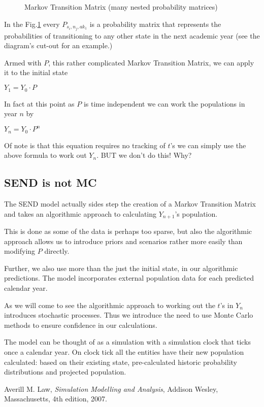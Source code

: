 \documentclass[margin=5mm]{article}
\begin{document}
\begin{appendices}
\begin{figure}[h!]
  \caption{Markov Transition Matrix (many nested probability
    matrices)\label{transition matrix}
  }
\end{figure}

In the Fig.\ref{transition matrix} every $P_{s_i,n_j,ak_1}$ is a
probability matrix that represents the probabilities of transitioning
to any other state in the next academic year (see the diagram's
cut-out for an example.)

Armed with $P$, this rather complicated Markov Transition Matrix, we can
apply it to the initial state

$Y_1 = Y_0 \cdot P$

In fact at this point as $P$ is time independent we can work the
populations in year $n$ by

$Y_n = Y_0 \cdot P^n$

Of note is that this equation requires no tracking of $t$'s we can
simply use the above formula to work out $Y_n$. BUT we don't do this!
Why?

\subsection{SEND is not MC}

The SEND model actually sides step the creation of a Markov Transition
Matrix and takes an algorithmic approach to calculating $Y_{n+1}$'s
population.

This is done as some of the data is perhaps too sparse, but also the
algorithmic approach allows us to introduce priors and scenarios
rather more easily than modifying $P$ directly.

Further, we also use more than the just the initial state, in our
algorithmic predictions.  The model incorporates external population
data for each predicted calendar year.

As we will come to see the algorithmic approach to working out the
$t$'s in $Y_n$ introduces stochastic processes. Thus we introduce the
need to use Monte Carlo methods to ensure confidence in our
calculations.

The model can be thought of as a simulation with a simulation clock
that ticks once a calendar year. On clock tick all the entities have
their new population calculated: based on their existing state,
pre-calculated historic probability distributions and projected
population.
\end{appendices}

\begin{thebibliography}{9}

  Averill M. Law,
  \textit{Simulation Modelling and Analysis},
  Addison Wesley, Massachusetts,
  4th edition,
  2007.

\end{thebibliography}
\end{document}
